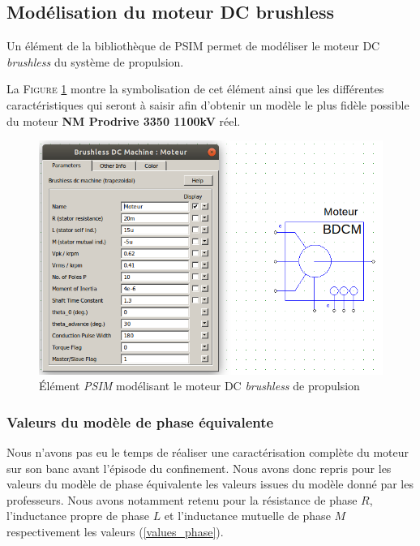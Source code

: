 		\subsection{Modélisation du moteur DC brushless}
			
		Un élément de la bibliothèque de PSIM permet de modéliser
		le moteur DC \textit{brushless} du système de propulsion.
		
		La \textsc{Figure \ref{psim_model_bldcm}} montre la symbolisation
		de cet élément ainsi que les différentes caractéristiques qui seront
		à saisir afin d'obtenir un modèle le plus fidèle possible du
		moteur \textbf{NM Prodrive 3350 1100kV} réel.
		
		\begin{figure}[h]
			\begin{center}
				\includegraphics[scale=0.55]{../Illus/psim_model_bldcm.png}
			\end{center}
			\caption{Élément \textit{PSIM} modélisant le moteur DC 
			\textit{brushless} de propulsion}
			\label{psim_model_bldcm}
		\end{figure}
		
			\subsubsection{Valeurs du modèle de phase équivalente}
			
			Nous n'avons pas eu le temps de réaliser une caractérisation
			complète du moteur sur son banc avant l'épisode du confinement.
			Nous avons donc repris pour les valeurs du modèle de phase
			équivalente les valeurs issues du modèle donné par les
			professeurs. Nous avons notamment retenu pour la résistance
			de phase $R$, l'inductance propre de phase $L$ et l'inductance
			mutuelle de phase $M$ respectivement les valeurs 
			(\ref{values_phase}).
			
